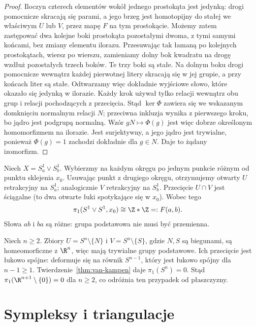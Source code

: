 \begin{proof}
Iloczyn czterech elementów wokół jednego prostokąta jest jedynką:
drogi pomocnicze skracają się parami, a jego brzeg jest homotopijny
do stałej we właściwym $U$ lub $V$, przez mapę $F$ na tym prostokącie.
Możemy zatem zastępować dwa kolejne boki prostokąta pozostałymi
dwoma, z tymi samymi końcami, bez zmiany elementu ilorazu.
Przesuwając tak łamaną po kolejnych prostokątach, wiersz po wierszu,
zamieniamy dolny bok kwadratu na drogę wzdłuż pozostałych trzech boków.
Te trzy boki są stałe. Na dolnym boku drogi pomocnicze wewnątrz
każdej pierwotnej litery skracają się w jej grupie, a przy końcach
liter są stałe. Odtwarzamy więc dokładnie wyjściowe słowo,
które okazało się jedynką w ilorazie. Każdy krok używał tylko
relacji wewnątrz obu grup i relacji pochodzących z przecięcia.
Stąd $\ker\Phi$ zawiera się we wskazanym domknięciu normalnym
relacji $N$; przeciwna inkluzja wynika z pierwszego kroku,
bo jądro jest podgrupą normalną. Wzór $gN\mapsto\Phi(g)$
jest więc dobrze określonym homomorfizmem na ilorazie.
Jest surjektywny, a jego jądro jest trywialne, ponieważ
$\Phi(g)=1$ zachodzi dokładnie dla $g\in N$. Daje to żądany izomorfizm.
\end{proof}

\begin{przyklad}
\label{prz:pi1-dwa-okregi}
Niech $X=S^1_a\vee S^1_b$.
Wybierzmy na każdym okręgu po jednym
punkcie różnym od punktu sklejenia
$x_0$. Usuwając punkt z drugiego
okręgu, otrzymujemy otwarty $U$
retrakcyjny na $S^1_a$; analogicznie
$V$ retrakcyjny na $S^1_b$.
Przecięcie $U\cap V$ jest ściągalne
(to dwa otwarte łuki spotykające się
w $x_0$). Wobec tego
\[
 \pi_1(S^1\vee S^1,x_0)
 \cong\Z*\Z=:F(a,b).
\]
Słowa $ab$ i $ba$ są różne:
grupa podstawowa nie musi być przemienna.
\end{przyklad}

\begin{przyklad}
\label{prz:pi1-sfera}
Niech $n\geq2$. Zbiory
$U=S^n\setminus\{N\}$ i
$V=S^n\setminus\{S\}$, gdzie $N,S$
są biegunami, są homeomorficzne
z $\R^n$, więc mają trywialne
grupy podstawowe. Ich przecięcie
jest łukowo spójne: deformuje się
na równik $S^{n-1}$, który jest
łukowo spójny dla $n-1\geq1$.
Twierdzenie~\ref{thm:van-kampen}
daje $\pi_1(S^n)=0$.
Stąd $\pi_1(\R^{n+1}\setminus\{0\})=0$
dla $n\geq2$, co odróżnia ten
przypadek od płaszczyzny.
\end{przyklad}

\section{Sympleksy i triangulacje}
\label{sec:sympleksy}

